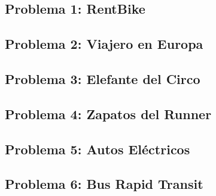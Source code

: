 \documentclass[12pt]{article}
\begin{document}
\thispagestyle{fancy}

\subsection*{Problema 1: RentBike}

\noindent
\subsection*{Problema 2: Viajero en Europa}

\noindent
\noindent
\subsection*{Problema 3: Elefante del Circo}

\noindent
\subsection*{Problema 4: Zapatos del Runner}

\noindent
\subsection*{Problema 5: Autos Eléctricos}

\noindent
\subsection*{Problema 6: Bus Rapid Transit}

\noindent
\end{document}
